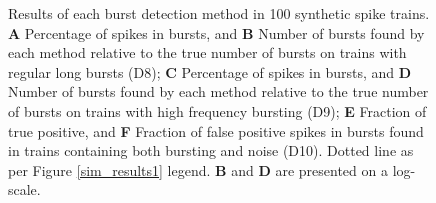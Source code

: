 \documentclass[12pt, titlepage]{article}
\begin{document}
		\begin{figure}
			\centering
			\caption{Results of each burst detection method in 100 synthetic spike trains. \textbf{A} Percentage of spikes in bursts, and \textbf{B} Number of bursts found by each method relative to the true number of bursts on trains with regular long bursts (D8); \textbf{C} Percentage of spikes in bursts, and \textbf{D} Number of bursts found by each method relative to the true number of bursts on trains with high frequency bursting (D9); \textbf{E} Fraction of true positive, and \textbf{F} Fraction of false positive spikes in bursts found in trains containing both bursting and noise (D10). Dotted line as per Figure \ref{sim_results1} legend. \textbf{B} and \textbf{D} are presented on a log-scale.}
			\label{sim_results2}
		\end{figure}	
\end{document}
